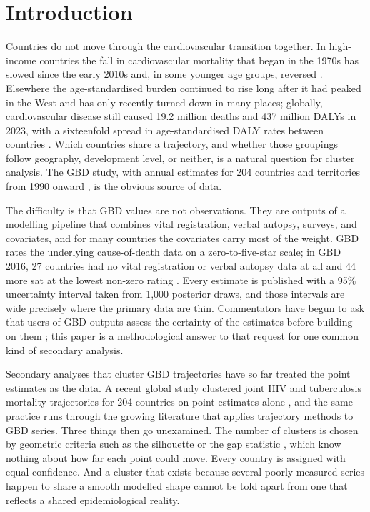 \documentclass[11pt,a4paper]{article}
\begin{document}
\section{Introduction}

Countries do not move through the cardiovascular transition together. In high-income countries the fall in cardiovascular mortality that began in the 1970s has slowed since the early 2010s and, in some younger age groups, reversed \citep{lopez2019,dowd2025}. Elsewhere the age-standardised burden continued to rise long after it had peaked in the West and has only recently turned down in many places; globally, cardiovascular disease still caused 19.2 million deaths and 437 million DALYs in 2023, with a sixteenfold spread in age-standardised DALY rates between countries \citep{gbdcvd2025}. Which countries share a trajectory, and whether those groupings follow geography, development level, or neither, is a natural question for cluster analysis. The GBD study, with annual estimates for 204 countries and territories from 1990 onward \citep{gbd2023dalys,gbd2023cod}, is the obvious source of data.

The difficulty is that GBD values are not observations. They are outputs of a modelling pipeline that combines vital registration, verbal autopsy, surveys, and covariates, and for many countries the covariates carry most of the weight. GBD rates the underlying cause-of-death data on a zero-to-five-star scale; in GBD 2016, 27 countries had no vital registration or verbal autopsy data at all and 44 more sat at the lowest non-zero rating \citep{gbd2016cod}. Every estimate is published with a 95\% uncertainty interval taken from 1,000 posterior draws, and those intervals are wide precisely where the primary data are thin. Commentators have begun to ask that users of GBD outputs assess the certainty of the estimates before building on them \citep{munozlaguna2024}; this paper is a methodological answer to that request for one common kind of secondary analysis.

Secondary analyses that cluster GBD trajectories have so far treated the point estimates as the data. A recent global study clustered joint HIV and tuberculosis mortality trajectories for 204 countries on point estimates alone \citep{hivtb2025}, and the same practice runs through the growing literature that applies trajectory methods to GBD series. Three things then go unexamined. The number of clusters is chosen by geometric criteria such as the silhouette \citep{rousseeuw1987} or the gap statistic \citep{tibshirani2001}, which know nothing about how far each point could move. Every country is assigned with equal confidence. And a cluster that exists because several poorly-measured series happen to share a smooth modelled shape cannot be told apart from one that reflects a shared epidemiological reality.
\end{document}
